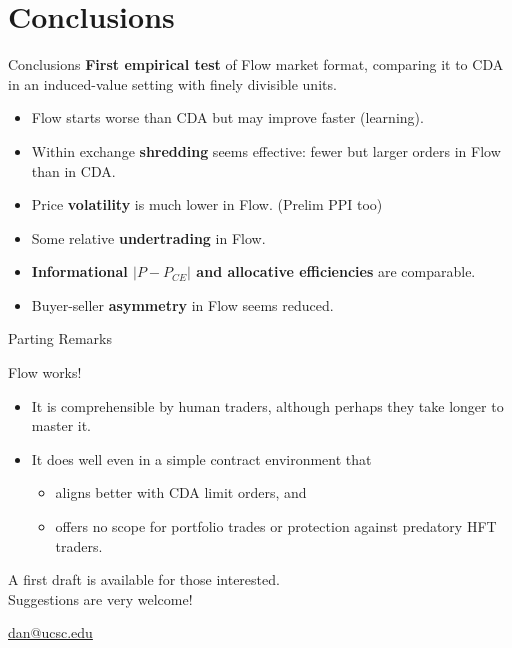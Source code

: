 \documentclass[10pt]{beamer}
\begin{document}


\section{Conclusions}

\begin{frame}{Conclusions}
\textbf{First empirical test} of Flow market format, comparing it to CDA in an induced-value setting with finely divisible units. \pause
\begin{itemize}
\item Flow starts worse than CDA but may improve faster (learning).
\item Within exchange \textbf{shredding} seems effective: fewer but larger orders in Flow than in CDA.
\item Price \textbf{volatility} is much lower in Flow. (Prelim PPI too) \pause
\item Some relative \textbf{undertrading} in Flow.
\item \textbf{Informational  $|P-P_{CE}|$ and allocative efficiencies} are comparable. \pause
\item Buyer-seller \textbf{asymmetry} in Flow seems reduced.\pause
\end{itemize} 
\end{frame}


\begin{frame}{Parting Remarks}

Flow works!
\begin{itemize}
    \item It is comprehensible by human traders, although perhaps they take longer to master it.
    \item It does well even in a simple contract environment that
\begin{itemize}
    \item aligns better with CDA limit orders, and
    \item offers no scope for portfolio trades or protection against predatory HFT traders.
\end{itemize}
\end{itemize}


\vspace{.4in}

\begin{center}
{\large A first draft is available for those interested. \\ Suggestions are very welcome!}

\url{dan@ucsc.edu}
    
\end{center}


\end{frame}
\end{document}

